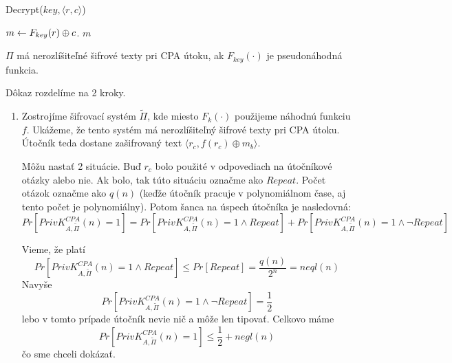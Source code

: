 \begin{procedure}[h!]
    \caption{Decrypt($key,\langle r,c\rangle$)}
    $m \leftarrow F_{key}(r) \oplus c$.
    \Return $m$\;
\end{procedure}

\begin{veta}
$\Pi$ má nerozlíšiteľné šifrové texty pri CPA útoku, ak $F_{key}(\cdot)$ 
je pseudonáhodná funkcia.
\end{veta}

\begin{dokaz}
    Dôkaz rozdelíme na 2 kroky.

    \begin{enumerate}
    \item Zostrojíme šifrovací systém $\tilde{\Pi}$, 
        kde miesto $F_k(\cdot)$ použijeme náhodnú funkciu $f$.
        Ukážeme, že tento systém má nerozlíšiteľný šifrové texty pri CPA útoku.
        Útočník teda dostane zašifrovaný text 
        $\langle r_c, f(r_c) \oplus m_b \rangle$.

        Môžu nastať 2 situácie. Buď $r_c$ bolo použité v odpovediach 
        na útočníkové otázky alebo nie. Ak bolo, tak túto situáciu
        označme ako $Repeat$. Počet otázok označme ako $q(n)$ 
        (keďže útočník pracuje v polynomiálnom čase, 
        aj tento počet je polynomiálny). 
        Potom šanca na úspech útočníka je nasledovná:
        \begin{equation*}
            Pr[PrivK_{A,\tilde{\Pi}}^{CPA}(n)=1] = 
                Pr[PrivK_{A,\tilde{\Pi}}^{CPA}(n)=1\land Repeat]  + 
                Pr[PrivK_{A,\tilde{\Pi}}^{CPA}(n)=1 \land \neg Repeat]
        \end{equation*}

        Vieme, že platí
        \begin{equation*}
            Pr[PrivK_{A,\tilde{\Pi}}^{CPA}(n)=1\land Repeat] \leq 
            Pr[Repeat] = \frac{q(n)}{2^n} = neql(n)
        \end{equation*}
        Navyše
        \begin{equation*}
            Pr[PrivK_{A,\tilde{\Pi}}^{CPA}(n)=1\land \neg Repeat] = 
                \frac{1}{2}
        \end{equation*}
        lebo v tomto prípade útočník nevie nič a môže len tipovať.
        Celkovo máme
        \begin{equation*}
            Pr[PrivK_{A,\tilde{\Pi}}^{CPA}(n)=1] \leq \frac{1}{2} + negl(n)
        \end{equation*}
        čo sme chceli dokázať.


\end{enumerate}
\end{dokaz}
